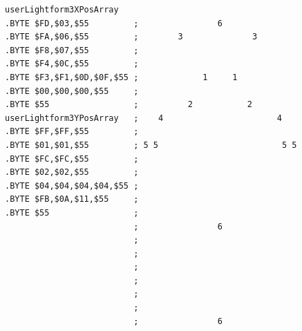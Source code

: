 \begin{minipage}[b]{0.48\linewidth}
\vspace{-0.3cm}
\begin{lrbox}{\mybox}%
\hspace{0.5cm}
\begin{lstlisting}[basicstyle=\ttfamily\tiny,escapechar=\%]
userLightform3XPosArray
.BYTE $FD,$03,$55         ;                6               
.BYTE $FA,$06,$55         ;        3              3        
.BYTE $F8,$07,$55         ;                                
.BYTE $F4,$0C,$55         ;                                
.BYTE $F3,$F1,$0D,$0F,$55 ;             1     1            
.BYTE $00,$00,$00,$55     ;                                
.BYTE $55                 ;          2           2         
userLightform3YPosArray   ;    4                       4   
.BYTE $FF,$FF,$55         ;                                
.BYTE $01,$01,$55         ; 5 5                         5 5
.BYTE $FC,$FC,$55         ;                                
.BYTE $02,$02,$55         ;                                
.BYTE $04,$04,$04,$04,$55 ;                                
.BYTE $FB,$0A,$11,$55     ;                                
.BYTE $55                 ;                                
                          ;                6               
                          ;                                
                          ;                                
                          ;                                
                          ;                                
                          ;                                
                          ;                                
                          ;                6               
\end{lstlisting}
\end{lrbox}%
\scalebox{0.8}{\usebox{\mybox}}

\end{minipage}
%
%
